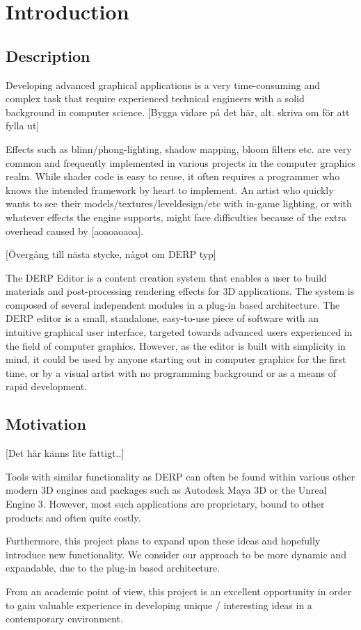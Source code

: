 \chapter{Introduction}
 
 \section{Description}
Developing advanced graphical applications is a very time-consuming and complex task that require experienced technical engineers with a solid background in computer science. [Bygga vidare på det här, alt. skriva om för att fylla ut]

Effects such as blinn/phong-lighting, shadow mapping, bloom filters etc. are very common and frequently implemented in various projects in the computer graphics realm. While shader code is easy to reuse, it often requires a programmer who knows the intended framework by heart to implement. An artist who quickly wants to see their models/textures/leveldesign/etc with in-game lighting, or with whatever effects the engine supports, might face difficulties because of the extra overhead caused by [aoaoaoaoa]. 

[Övergång till nästa stycke, något om DERP typ]

The DERP Editor is a content creation system that enables a user to build materials and post-processing rendering effects for 3D applications. The system is composed of several independent modules in a plug-in based architecture. The DERP editor is a small, standalone, easy-to-use piece of software with an intuitive graphical user interface, targeted towards advanced users experienced in the field of computer graphics. However, as the editor is built with simplicity in mind, it could be used by anyone starting out in computer graphics for the first time, or by a visual artist with no programming background or as a means of rapid development. 

\section{Motivation}
[Det här känns lite fattigt..]

Tools with similar functionality as DERP can often be found within various other modern 3D engines and packages such as Autodesk Maya 3D or the Unreal Engine 3. However, most such applications are proprietary, bound to other products and often quite costly. 
 
Furthermore, this project plans to expand upon these ideas and hopefully introduce new functionality. We consider our approach to be more dynamic and expandable, due to the plug-in based architecture. 
 
From an academic point of view, this project is an excellent opportunity in order to gain valuable experience in developing unique / interesting ideas in a contemporary environment. 
 